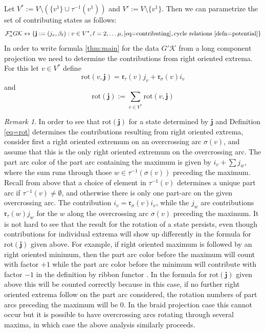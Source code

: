 \documentclass[11pt]{article}
\theoremstyle{definition}
\theoremstyle{remark}
\newtheorem*{rem}{Remark}
\theoremstyle{remark}
\begin{document}
Let
$V^*:=V\setminus (\{v^1\}\cup \tau^{-1}(v^1))$ and $V':=V\setminus \{v^1\}$. Then we can parametrize the set of contributing states as follows:
\begin{equation}\label{eq=contributing states}
\mathcal{F}_n^*G\mathcal{K}\leftrightarrow \{\mathbf{j}:=(j_v,\beta_{\ell }): v\in V^*,\ell =2,\ldots \mu, \eqref{eq=contributing}, \textrm{cycle relations} \ \ref{defn=potential} \}
\end{equation}
In order to write formula \ref{thm:main} for the data $G'\mathcal{K}$ from a long component projection we need to determine 
the contributions from right oriented extrema. For this let $v\in V^*$ define
\begin{equation}\label{eq=rot}
\textrm{rot}(v,\mathbf{j})=\mathfrak{r}_{\tau }(v)j_v+\mathfrak{r}_{\sigma }(v)i_v
\end{equation}
and
$$\textrm{rot}(\mathbf{j}):=\sum_{v\in V^*}\textrm{rot}(v,\mathbf{j})$$

\begin{rem}
In order to see that $\textrm{rot}(\mathbf{j})$ for a state determined by $\mathbf{j}$ and Definition \eqref{eq=rot} determines the contributions resulting from right oriented extrema, consider first a right oriented extremum on an overcrossing arc $\sigma (v)$, and assume that this is the only right oriented extremum on the overcrossing arc. The part arc color of the part arc containing the maximum is given by 
$i_v+\sum j_w$, where the sum runs through those $w\in \tau^{-1}(\sigma (v))$ preceding the maximum.  Recall from above that 
a choice of element in $\tau^{-1}(v)$ determines a unique part arc if $\tau^{-1}(v)\neq \emptyset $, and otherwise there is only one part-arc on the given overcrossing arc. The contribution $i_v=\mathfrak{r}_{\sigma }(v)i_v$, while the $j_w$ are contributions $\mathfrak{r}_{\tau }(w)j_w$ for the $w$ along the overcrossing arc $\sigma (v)$ preceding the maximum. It is not hard to see that 
the result for the rotation of a state persists, even though contributions for individual extrema will show up differently in the formula for $\textrm{rot}(\mathbf{j})$ given above. For example, if right oriented maximum is followed by an right oriented minimum, then 
the part arc color before the maximum will count with factor $+1$ while the part arc color before the minimum will contribute with factor $-1$ in the definition by ribbon functor \cite{L}. In the formula for $\textrm{rot}(\mathbf{j})$ given above this will be counted correctly because in this case, if no further right oriented extrema follow on the part arc considered, the rotation numbers of part arcs preceding the maximum will be $0$.
In the braid projection case this cannot occur but it is possible to have overcrossing arcs rotating through several maxima, in which case the above analysis similarly proceeds. 
\end{rem}
\end{document}
